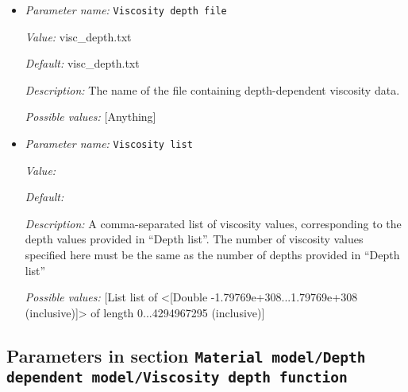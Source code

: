 \begin{itemize}
{\it Value:} 


{\it Default:} 


{\it Description:} A comma-separated list of depth values for use with the ``List'' ``Depth dependence method''. The list must be provided in order ofincreasing depth, and the last value must be greater than or equal to the maximal depth of the model. The depth list is interpreted as a layered viscosity structure and the depth values specify the maximum depths of each layer. 


{\it Possible values:} [List list of <[Double -1.79769e+308...1.79769e+308 (inclusive)]> of length 0...4294967295 (inclusive)]
\item {\it Parameter name:} {\tt Viscosity depth file}
\label{parameters:Material model/Depth dependent model/Viscosity depth file}


{\it Value:} visc_depth.txt


{\it Default:} visc_depth.txt


{\it Description:} The name of the file containing depth-dependent viscosity data. 


{\it Possible values:} [Anything]
\item {\it Parameter name:} {\tt Viscosity list}
\label{parameters:Material model/Depth dependent model/Viscosity list}


{\it Value:} 


{\it Default:} 


{\it Description:} A comma-separated list of viscosity values, corresponding to the depth values provided in ``Depth list''. The number of viscosity values specified here must be the same as the number of depths provided in ``Depth list'' 


{\it Possible values:} [List list of <[Double -1.79769e+308...1.79769e+308 (inclusive)]> of length 0...4294967295 (inclusive)]
\end{itemize}



\subsection{Parameters in section \tt Material model/Depth dependent model/Viscosity depth function}
\label{parameters:Material_20model/Depth_20dependent_20model/Viscosity_20depth_20function}

